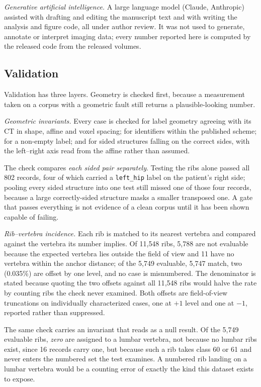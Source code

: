 \documentclass[aapm,mph,amsmath,amssymb,reprint]{revtex4-2}
\begin{document}
\emph{Generative artificial intelligence.} A large language model (Claude, Anthropic)
assisted with drafting and editing the manuscript text and with writing the analysis and
figure code, all under author review. It was not used to generate, annotate or interpret
imaging data; every number reported here is computed by the released code from the
released volumes.

\subsection{Validation}
\label{sec:validation}


Validation has three layers. Geometry is checked first, because a measurement taken on a corpus with a geometric fault still returns a plausible-looking number.

\emph{Geometric invariants.} Every case is checked for label geometry agreeing with its CT
in shape, affine and voxel spacing; for identifiers within the published scheme; for a
non-empty label; and for sided structures falling on the correct sides, with the left--right
axis read from the affine rather than assumed. 

The check compares \emph{each sided pair separately}. Testing the ribs alone passed all
802 records, four of which carried a \texttt{left\_hip} label on the patient's right side;
pooling every sided structure into one test still missed one of those four records, because
a large correctly-sided structure masks a smaller transposed one. A gate that passes everything is
not evidence of a clean corpus until it has been shown capable of failing.

\emph{Rib--vertebra incidence.} Each rib is matched to its nearest vertebra and compared
against the vertebra its number implies. Of 11{,}548 ribs, 5{,}788 are not evaluable
because the expected vertebra lies outside the field of view and 11 have no vertebra within
the anchor distance; of the 5{,}749 evaluable, 5{,}747 match, two (0.035\%) are offset by one
level, and no case is misnumbered. The denominator is stated because quoting the two
offsets against all 11{,}548 ribs would halve the rate by counting ribs the check never
examined. Both offsets are field-of-view truncations on individually characterized cases,
one at $+1$ level and one at $-1$, reported rather than suppressed.

The same check carries an invariant that reads as a null result. Of the 5{,}749 evaluable
ribs, \emph{zero} are assigned to a lumbar vertebra, not because no lumbar ribs exist,
since 16 records carry one, but because such a rib takes class 60 or 61 and never enters the
numbered set the test examines. A numbered rib landing on a lumbar vertebra would be a
counting error of exactly the kind this dataset exists to expose.
\end{document}
